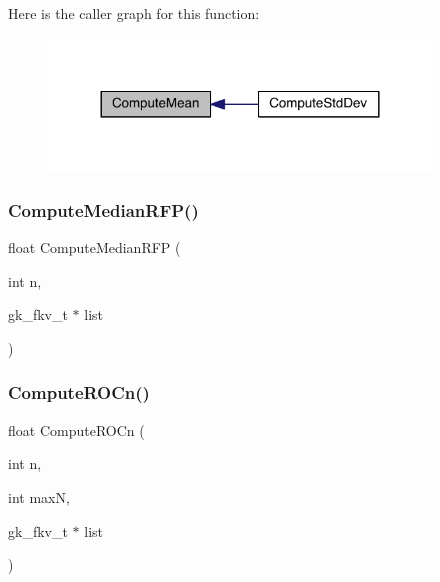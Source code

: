 Here is the caller graph for this function\+:\nopagebreak
\begin{figure}[H]
\begin{center}
\leavevmode
\includegraphics[width=288pt]{a00029_aeeed505299d523a6061b0c1966d88427_icgraph}
\end{center}
\end{figure}
\mbox{\label{a00029_a0712d76a8c05b906a790c20887ad1874}} 
\subsubsection{\texorpdfstring{Compute\+Median\+R\+F\+P()}{ComputeMedianRFP()}}
{\footnotesize\ttfamily float Compute\+Median\+R\+FP (\begin{DoxyParamCaption}\item[{int}]{n,  }\item[{gk\+\_\+fkv\+\_\+t $\ast$}]{list }\end{DoxyParamCaption})}

\mbox{\label{a00029_a8df1d3501976b7a3168df9f80ccf0cf6}} 
\subsubsection{\texorpdfstring{Compute\+R\+O\+Cn()}{ComputeROCn()}}
{\footnotesize\ttfamily float Compute\+R\+O\+Cn (\begin{DoxyParamCaption}\item[{int}]{n,  }\item[{int}]{maxN,  }\item[{gk\+\_\+fkv\+\_\+t $\ast$}]{list }\end{DoxyParamCaption})}

\mbox{\label{a00029_a59fad97dedb62ff1ae0722de46318412}} 
